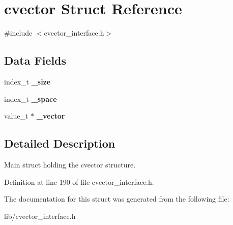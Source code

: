 \hypertarget{structcvector}{}\section{cvector Struct Reference}
\label{structcvector}


{\ttfamily \#include $<$cvector\+\_\+interface.\+h$>$}

\subsection*{Data Fields}
\begin{DoxyCompactItemize}
\item 
\mbox{\label{structcvector_a44c9984fcdd1c44d35235c67909dcc79}} 
index\+\_\+t {\bfseries \+\_\+size}
\item 
\mbox{\label{structcvector_a5948a8ef12921a8fc535fbcb48d4d4d4}} 
index\+\_\+t {\bfseries \+\_\+space}
\item 
\mbox{\label{structcvector_ae60afc8a80c3a6c945520216265ebbe0}} 
value\+\_\+t $\ast$ {\bfseries \+\_\+vector}
\end{DoxyCompactItemize}


\subsection{Detailed Description}
Main struct holding the cvector structure. 

Definition at line 190 of file cvector\+\_\+interface.\+h.



The documentation for this struct was generated from the following file\+:\begin{DoxyCompactItemize}
\item 
lib/cvector\+\_\+interface.\+h\end{DoxyCompactItemize}
